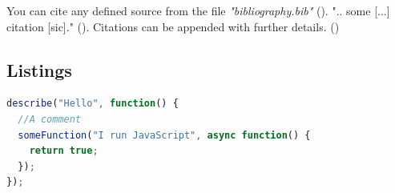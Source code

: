 You can cite any defined source from the file \textit{"bibliography.bib"} (\cite{google}).
\newline
".. some [...] citation [sic]." (\cite{some-master}).
\newline
Citations can be appended with further details. (\cite[p. 169]{my-book})

\subsection{Listings}
\label{ssec:listings}

\begin{lstlisting}[language=javascript,caption=Some JavaScript Code,label=lst:code]
describe("Hello", function() {
  //A comment
  someFunction("I run JavaScript", async function() {
    return true;
  });
});
\end{lstlisting}